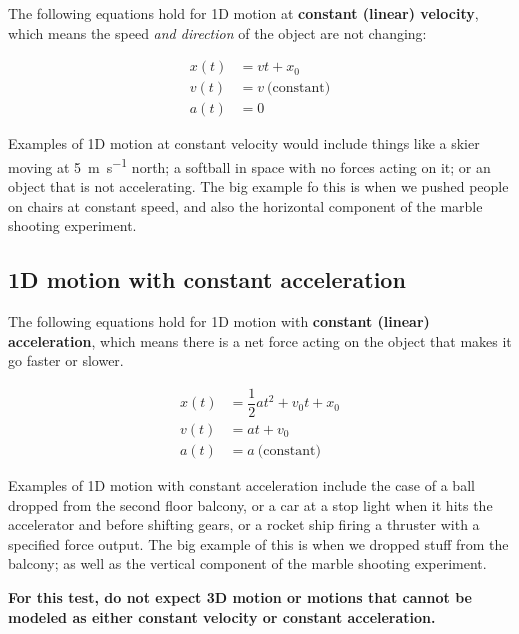 \documentclass{tufte-handout}
\begin{document}
The following equations hold for 1D motion at \textbf{constant (linear)
velocity}, which means the speed \emph{and
direction} of the object are not changing:

\begin{align}
x(t) &= v t + x_0 \\
v(t) &= v\ \text{(constant)} \\
a(t) &= 0
\end{align}

Examples of 1D motion at constant velocity would include things like a
skier moving at \qty{5}{\meter\per\second} north; a softball in space
with no forces acting on it; or an object that is not accelerating. The
big example fo this is when we pushed people on chairs at constant
speed, and also the horizontal component of the marble shooting
experiment.

\hypertarget{d-motion-with-constant-acceleration}{%
\subsection{1D motion with constant
acceleration}\label{d-motion-with-constant-acceleration}}

The following equations hold for 1D motion with \textbf{constant
(linear) acceleration}, which means there is a net force acting on the
object that makes it go faster or slower.

\begin{align}
x(t) &= \dfrac{1}{2} a t^2 + v_0 t + x_0 \\
v(t) &= at + v_0 \\
a(t) &= a\ \text{(constant)} 
\end{align}

Examples of 1D motion with constant acceleration include the case of a
ball dropped from the second floor balcony, or a car at a stop light
when it hits the accelerator and before shifting gears, or a rocket ship
firing a thruster with a specified force output. The big example of this
is when we dropped stuff from the balcony; as well as the vertical
component of the marble shooting experiment.

\textbf{For this test, do not expect 3D motion or motions that cannot be
modeled as either constant velocity or constant acceleration.}
\end{document}
